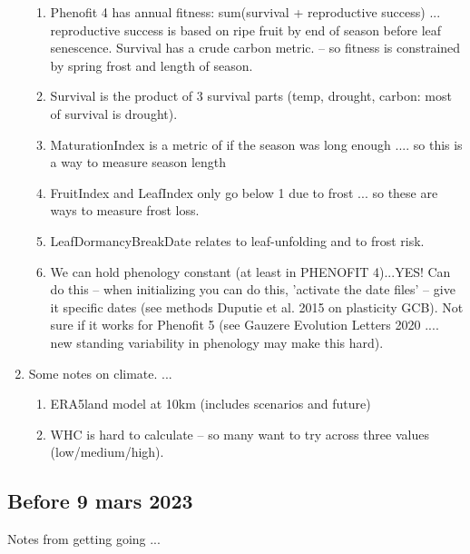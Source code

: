 \documentclass[11pt,letter]{article}
\begin{document}
\begin{enumerate}
\begin{enumerate}
\item Phenofit 4 has annual fitness: sum(survival + reproductive success) ... reproductive success is based on ripe fruit by end of season before leaf senescence. Survival has a crude carbon metric. -- so fitness is constrained by spring frost and length of season. 
\item Survival is the product of 3 survival parts (temp, drought, carbon: most of survival is drought).
\item MaturationIndex is a metric of if the season was long enough .... so this is a way to measure season length
\item FruitIndex and LeafIndex only go below 1 due to frost ... so these are ways to measure frost loss. 
\item LeafDormancyBreakDate relates to leaf-unfolding and to frost risk. 
\item We can hold phenology constant (at least in PHENOFIT 4)...YES! Can do this -- when initializing you can do this, 'activate the date files' -- give it specific dates (see methods Duputie et al. 2015 on plasticity GCB). Not sure if it works for Phenofit 5 (see Gauzere Evolution Letters 2020 .... new standing variability in phenology may make this hard). 
\end{enumerate}
\item Some notes on climate. ... 
\begin{enumerate}
\item ERA5land model at 10km (includes scenarios and future) %
\item WHC is hard to calculate -- so many want to try across three values (low/medium/high). 
\end{enumerate}
\end{enumerate}

\subsection{Before 9 mars 2023}

Notes from getting going ... 
\end{document}
